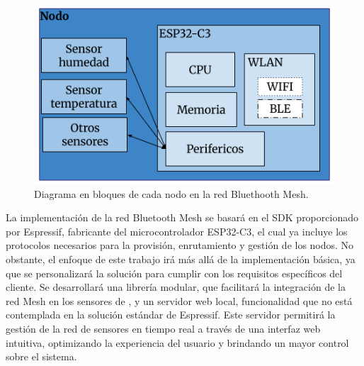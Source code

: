 \documentclass[
11pt, %
]{charter}
\begin{document}
\begin{figure}[htpb]
\centering 
\includegraphics[width=.42\textwidth]{./Figuras/Diagrama-esp32-c3.png}
\caption{Diagrama en bloques de cada nodo en la red Bluethooth Mesh.}
\label{fig:diagBloquesEsp32}
\end{figure}

La implementación de la red Bluetooth Mesh se basará en el SDK proporcionado por Espressif, fabricante del microcontrolador ESP32-C3, el cual ya incluye los protocolos necesarios para la provisión, enrutamiento y gestión de los nodos. No obstante, el enfoque de este trabajo irá más allá de la implementación básica, ya que se personalizará la solución para cumplir con los requisitos específicos del cliente. Se desarrollará una librería modular, que facilitará la integración de la red Mesh en los sensores de {\empclientename}, y un servidor web local, funcionalidad que no está contemplada en la solución estándar de Espressif. Este servidor permitirá la gestión de la red de sensores en tiempo real a través de una interfaz web intuitiva, optimizando la experiencia del usuario y brindando un mayor control sobre el sistema.
\end{document}

